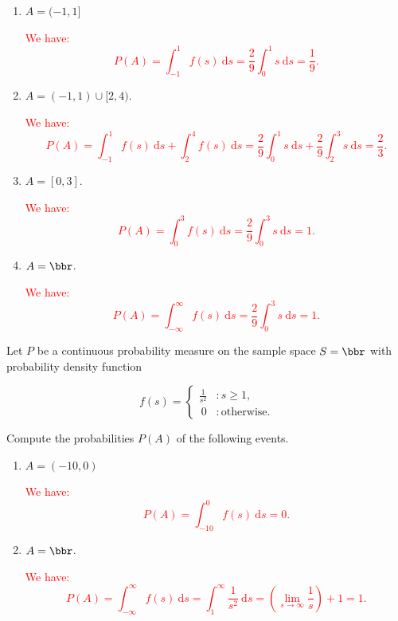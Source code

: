 \documentclass[12pt,reqno]{amsart}
\begin{document}
\medskip
\begin{enumerate}
    \item $A=(-1, 1]$
    
    \bigskip
    \textcolor{red}{We have:
        \[P(A) = \int_{-1}^1 f(s) \ \text{d}s = \frac{2}{9}\int_0^1 s \ \text{d} s = \frac{1}{9}. \]}
    \bigskip

    \item $A = (-1,1) \cup [2, 4)$.
    
    \bigskip
    \textcolor{red}{We have:
        \[P(A) = \int_{-1}^1f(s) \ \text{d}s + \int_2^4 f(s) \ \text{d}s = \frac{2}{9} \int_0^1 s \ \text{d}s + \frac{2}{9} \int_2^3 s \ \text{d}s = \frac{2}{3}.  \]}
    \bigskip

    \item $A = [0,3]$.
    
    \bigskip
    \textcolor{red}{We have:
        \[P(A) = \int_{0}^3f(s) \ \text{d}s = \frac{2}{9} \int_0^3 s \ \text{d}s =1.  \]}
    \bigskip

    \item $A = \bbr$.
    
    \bigskip
    \textcolor{red}{We have:
        \[P(A) = \int_{-\infty}^\infty f(s) \ \text{d}s = \frac{2}{9} \int_0^3 s \ \text{d}s =1.  \]}
\end{enumerate}











\bigskip
\prob Let $P$ be a continuous probability measure on the sample space $S=\bbr$ with probability density function

    \[f(s) = \begin{cases}
    \displaystyle\frac{1}{s^2} & : s \geq 1, \\\
    0 & : \text{otherwise}.    
    \end{cases}\]

Compute the probabilities $P(A)$ of the following events.

\medskip
\begin{enumerate}
    \item $A=(-10, 0)$
    
    \bigskip
    \textcolor{red}{We have:
        \[P(A) = \int_{-10}^0 f(s) \ \text{d}s = 0. \]}
    \bigskip

    \item $A = \bbr$.
    
    \bigskip
    \textcolor{red}{We have:
        \[P(A) = \int_{-\infty}^\infty f(s) \ \text{d}s = \int_1^\infty \frac{1}{s^2} \ \text{d}s = \left(\lim_{s\to \infty} \frac{1}{s}\right) + 1 = 1.  \]}
\end{enumerate}
\end{document}
